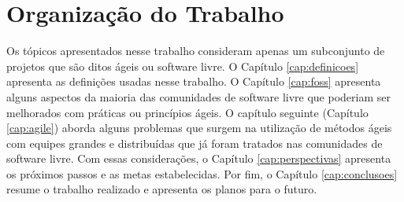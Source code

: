 \section{Organização do Trabalho}
\label{sec:organizacao_trabalho}

Os tópicos apresentados nesse trabalho consideram apenas um
subconjunto de projetos que são ditos ágeis ou software livre. O
Capítulo \ref{cap:definicoes} apresenta as definições usadas nesse
trabalho. O Capítulo \ref{cap:foss} apresenta alguns aspectos da
maioria das comunidades de software livre que poderiam ser melhorados
com práticas ou princípios ágeis. O capítulo seguinte (Capítulo
\ref{cap:agile}) aborda alguns problemas que surgem na utilização de
métodos ágeis com equipes grandes e distribuídas que já foram tratados
nas comunidades de software livre. Com essas considerações, o Capítulo
\ref{cap:perspectivas} apresenta os próximos passos e as metas
estabelecidas. Por fim, o Capítulo \ref{cap:conclusoes} resume o
trabalho realizado e apresenta os planos para o futuro.
